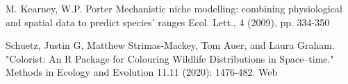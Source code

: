 \documentclass[12pt,a4paper]{article}
\begin{document}
\begin{thebibliography}{999}
M. Kearney, W.P. Porter
Mechanistic niche modelling: combining physiological and spatial data to predict species’ ranges
Ecol. Lett., 4 (2009), pp. 334-350

Schuetz, Justin G, Matthew Strimas‐Mackey, Tom Auer, and Laura Graham. "Colorist: An R Package for Colouring Wildlife Distributions in Space–time." Methods in Ecology and Evolution 11.11 (2020): 1476-482. Web


\end{thebibliography}
\end{document}
